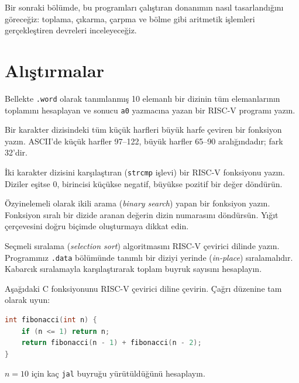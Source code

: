 Bir sonraki bölümde, bu programları çalıştıran donanımın nasıl tasarlandığını göreceğiz: toplama, çıkarma, çarpma ve bölme gibi aritmetik işlemleri gerçekleştiren devreleri inceleyeceğiz.


\section*{Alıştırmalar}

\begin{alistirma}[\kolay]
Bellekte \texttt{.word} olarak tanımlanmış 10 elemanlı bir dizinin tüm elemanlarının toplamını hesaplayan ve sonucu \texttt{a0} yazmacına yazan bir RISC-V programı yazın.
\end{alistirma}

\begin{alistirma}[\kolay]
Bir karakter dizisindeki tüm küçük harfleri büyük harfe çeviren bir fonksiyon yazın. ASCII'de küçük harfler 97--122, büyük harfler 65--90 aralığındadır; fark 32'dir.
\end{alistirma}

\begin{alistirma}[\kolay]
İki karakter dizisini karşılaştıran (\texttt{strcmp} işlevi) bir RISC-V fonksiyonu yazın. Diziler eşitse 0, birincisi küçükse negatif, büyükse pozitif bir değer döndürün.
\end{alistirma}

\begin{alistirma}[\orta]
Özyinelemeli olarak ikili arama (\emph{binary search}) yapan bir fonksiyon yazın. Fonksiyon sıralı bir dizide aranan değerin dizin numarasını döndürsün. Yığıt çerçevesini doğru biçimde oluşturmaya dikkat edin.
\end{alistirma}

\begin{alistirma}[\orta]
Seçmeli sıralama (\emph{selection sort}) algoritmasını RISC-V çevirici dilinde yazın. Programınız \texttt{.data} bölümünde tanımlı bir diziyi yerinde (\emph{in-place}) sıralamalıdır. Kabarcık sıralamayla karşılaştırarak toplam buyruk sayısını hesaplayın.
\end{alistirma}

\begin{alistirma}[\orta]
Aşağıdaki C fonksiyonunu RISC-V çevirici diline çevirin. Çağrı düzenine tam olarak uyun:
\begin{lstlisting}[language=C, style=alistirma-kod]
int fibonacci(int n) {
    if (n <= 1) return n;
    return fibonacci(n - 1) + fibonacci(n - 2);
}
\end{lstlisting}
$n = 10$ için kaç \texttt{jal} buyruğu yürütüldüğünü hesaplayın.
\end{alistirma}

